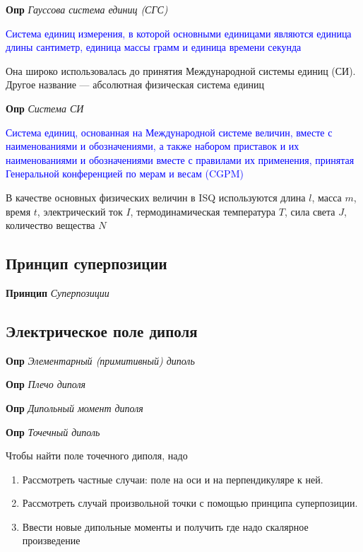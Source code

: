 \documentclass[a4paper, 14pt]{article}
\begin{document}
    \textbf{Опр} \textit{Гауссова система единиц (СГС)}
    
    \textcolor{blue}{Система единиц измерения, в которой основными единицами являются единица длины сантиметр,
        единица массы грамм и единица времени секунда}
    
    Она широко использовалась до принятия Международной системы единиц (СИ).
    Другое название — абсолютная физическая система единиц
    
    \textbf{Опр} \textit{Система СИ}
    
    \textcolor{blue}{Система единиц, основанная на Международной системе величин, вместе с наименованиями и обозначениями, а также
    набором приставок и их наименованиями и обозначениями вместе с правилами их применения, принятая Генеральной
    конференцией по мерам и весам (CGPM)}
    
    В качестве основных физических величин в ISQ используются длина $l$, масса $m$, время $t$, электрический
    ток $I$, термодинамическая температура $T$, сила света $J$, количество вещества $N$
    
    \subsection{Принцип суперпозиции}
    
    \textbf{Принцип} \textit{Суперпозиции}
    
    \subsection{Электрическое поле диполя}
    
     \textbf{Опр} \textit{Элементарный (примитивный) диполь}
    
    \textbf{Опр} \textit{Плечо диполя}
    
    \textbf{Опр} \textit{Дипольный момент диполя}
    
    \textbf{Опр} \textit{Точечный диполь}
    
    Чтобы найти поле точечного диполя, надо
    
    \begin{enumerate}
        \item Рассмотреть частные случаи: поле на оси и на перпендикуляре к ней.
        \item Рассмотреть случай произвольной точки с помощью принципа суперпозиции.
        \item Ввести новые дипольные моменты и получить где надо скалярное произведение
    \end{enumerate}
    
\end{document}
